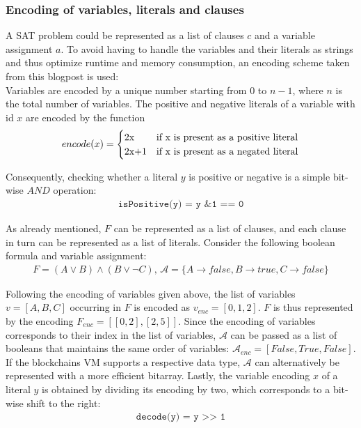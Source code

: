 \subsubsection{Encoding of variables, literals and clauses}
A SAT problem could be represented as a list of clauses $c$ and a variable assignment $a$. To avoid having to handle the variables and their literals as strings and thus optimize runtime and memory consumption, an encoding scheme taken from this blogpost\cite{sabablog} is used: \\
Variables are encoded by a unique number starting from $0$ to $n-1$, where $n$ is the total number of variables. The positive and negative literals of a variable with id $x$ are encoded by the function
\begin{align*}
encode(x) =
\begin{cases}
  $2x$  & \text{if x is present as a positive literal}\\
  $2x+1$ & \text{if x is present as a negated literal}\\
\end{cases}   
\end{align*}

Consequently, checking whether a literal $y$ is positive or negative is a simple bit-wise $AND$ operation:
\begin{align*}
\texttt{isPositive(y) = y \& 1 == 0}
\end{align*}

As already mentioned, $F$ can be represented as a list of clauses, and each clause in turn can be represented as a list of literals. Consider the following boolean formula and variable assignment:
\begin{align*}
F = (A \vee B) \wedge (B \vee \neg C) \text{, } \mathcal{A} = \{A \rightarrow false, B \rightarrow true, C \rightarrow false\}
\end{align*}

Following the encoding of variables given above, the list of variables $v=[A,B,C]$ occurring in $F$ is encoded as $v_{enc} = [0,1,2]$. $F$ is thus represented by the encoding $F_{enc} = [[0,2],[2,5]]$. Since the encoding of variables corresponds to their index in the list of variables, $\mathcal{A}$ can be passed as a list of booleans that maintains the same order of variables: $\mathcal{A}_{enc} = [False, True, False]$. If the blockchains VM supports a respective data type, $\mathcal{A}$ can alternatively be represented with a more efficient bitarray. Lastly, the variable encoding $x$ of a literal $y$ is obtained by dividing its encoding by two, which corresponds to a bit-wise shift to the right:
\begin{align*}
\texttt{decode(y) = y >> 1}
\end{align*}

